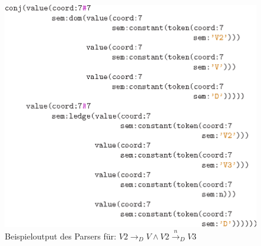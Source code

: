 \begin{figure}
\begin{center}
\includegraphics[scale=1.0]{eps/output}
\end{center}
\caption{Beispieloutput des Parsers f\"ur: $V2 \rightarrow_D V \wedge
 V2 \overset{n}{\rightarrow}_D V3$}
\label{parseroutput}
\end{figure}

